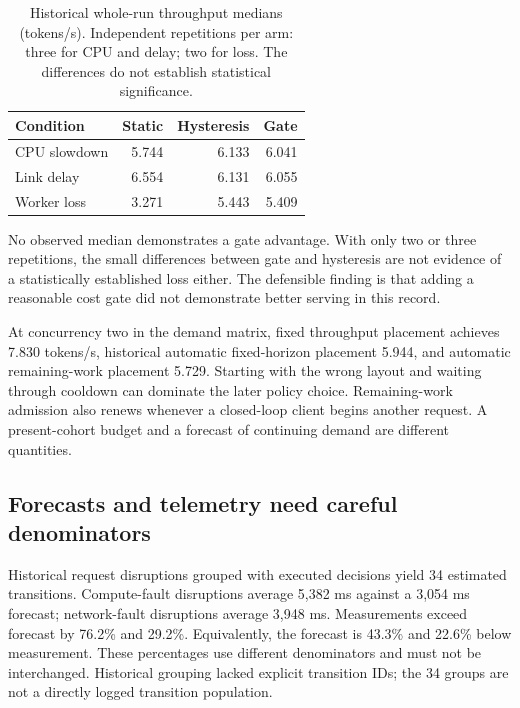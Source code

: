 \documentclass[conference]{IEEEtran}
\begin{document}
\begin{table}[t]
\centering\small
\caption{Historical whole-run throughput medians (tokens/s). Independent repetitions per arm: three for CPU and delay; two for loss. The differences do not establish statistical significance.}
\begin{tabular}{lrrr}
\toprule Condition & Static & Hysteresis & Gate\\
\midrule CPU slowdown & 5.744 & 6.133 & 6.041\\
Link delay & 6.554 & 6.131 & 6.055\\
Worker loss & 3.271 & 5.443 & 5.409\\
\bottomrule
\end{tabular}
\label{tab:adaptation}
\end{table}

No observed median demonstrates a gate advantage. With only two or three
repetitions, the small differences between gate and hysteresis are not
evidence of a statistically established loss either. The defensible
finding is that adding a reasonable cost gate did not demonstrate better
serving in this record.

At concurrency two in the demand matrix, fixed throughput placement
achieves 7.830 tokens/s, historical automatic fixed-horizon placement
5.944, and automatic remaining-work placement 5.729. Starting with the
wrong layout and waiting through cooldown can dominate the later policy
choice. Remaining-work admission also renews whenever a closed-loop
client begins another request. A present-cohort budget and a forecast of
continuing demand are different quantities.

\hypertarget{forecasts-and-telemetry-need-careful-denominators}{%
\subsection{Forecasts and telemetry need careful
denominators}\label{forecasts-and-telemetry-need-careful-denominators}}

Historical request disruptions grouped with executed decisions yield 34
estimated transitions. Compute-fault disruptions average 5,382 ms
against a 3,054 ms forecast; network-fault disruptions average 3,948 ms.
Measurements exceed forecast by 76.2\% and 29.2\%. Equivalently, the
forecast is 43.3\% and 22.6\% below measurement. These percentages use
different denominators and must not be interchanged. Historical grouping
lacked explicit transition IDs; the 34 groups are not a directly logged
transition population.
\end{document}

